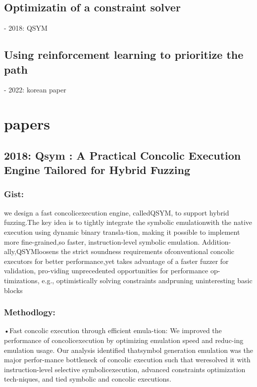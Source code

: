 \documentclass[	runningheads,
				a4paper]{llncs}
\begin{document}

\subsection{Optimizatin of a constraint solver}
- 2018: QSYM


\subsection{Using reinforcement learning to prioritize the path}
- 2022: korean paper


\section{papers}


\subsection{2018: Qsym : A Practical Concolic Execution Engine Tailored for Hybrid Fuzzing}
\subsubsection{Gist:}
we design a fast concolicexecution engine, calledQSYM, to support hybrid fuzzing.The key idea is to tightly integrate the symbolic emulationwith the native execution using dynamic binary transla-tion, making it possible to implement more fine-grained,so faster, instruction-level symbolic emulation. Addition-ally,QSYMloosens the strict soundness requirements ofconventional concolic executors for better performance,yet takes advantage of a faster fuzzer for validation, pro-viding unprecedented opportunities for performance op-timizations, e.g., optimistically solving constraints andpruning uninteresting basic blocks

\subsubsection{Methodlogy:}
•Fast concolic execution through efficient emula-tion:
We  improved  the  performance  of  concolicexecution by optimizing emulation speed and reduc-ing emulation usage.  Our analysis identified thatsymbol generation emulation was the major perfor-mance bottleneck of concolic execution such that weresolved it with instruction-level selective symbolicexecution, advanced constraints optimization tech-niques, and tied symbolic and concolic executions.
\end{document}
